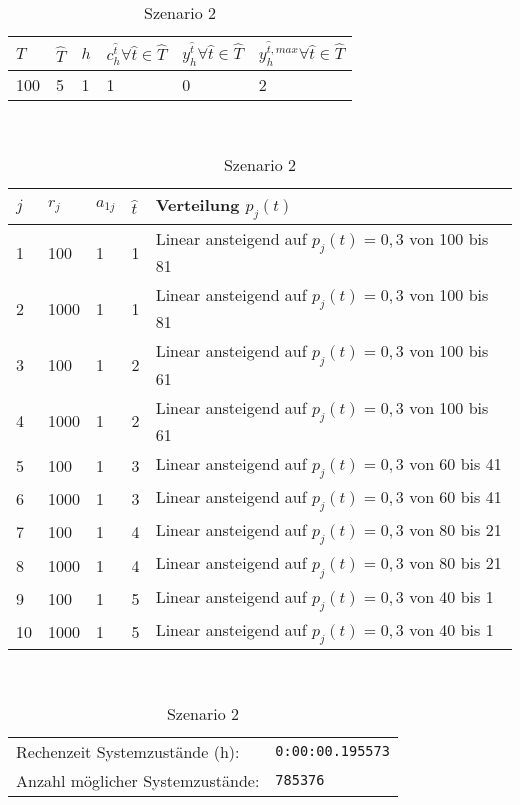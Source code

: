 \begin{table}[h!]
\renewcommand{\arraystretch}{1.5}
  \begin{center}
    \caption{Szenario 2}  \label{S2}
    \vspace*{3mm}
    \begin{tabular}{l l l l l l}   %
    $T$ & $\hat T$  & $h$ & $c_h^{\hat t}\forall \hat{t}\in{\hat T}$ & $y_h^{\hat t}\forall \hat{t}\in{\hat T}$  & $y_h^{{\hat t},max}\forall \hat{t}\in{\hat T}$  \\  \hline
100 & 5 & 1 & 1 & 0 & 2  \\ \hline
    \end{tabular} \\[3mm]
        \begin{tabular}{p{.5cm} p{.5cm} p{.5cm}  p{.5cm} p{9cm}}   %
    $j$ & $r_j$  & $a_{1j}$ & $\hat t$ & Verteilung $p_j(t)$ \\  \hline
1 & 100 & 1 & 1 & Linear ansteigend auf $p_j(t)=0,3$ von 100 bis 81   \\
2 & 1000 & 1 & 1 & Linear ansteigend auf $p_j(t)=0,3$ von 100 bis 81  \\
3 & 100 & 1 & 2 & Linear ansteigend auf $p_j(t)=0,3$ von 100 bis 61  \\
4 & 1000 & 1 & 2 & Linear ansteigend auf $p_j(t)=0,3$ von 100 bis 61  \\
5 & 100 & 1 & 3 & Linear ansteigend auf $p_j(t)=0,3$ von 60 bis 41 \\
6 & 1000 & 1 & 3 & Linear ansteigend auf $p_j(t)=0,3$ von 60 bis 41 \\
7 & 100 & 1 & 4 & Linear ansteigend auf $p_j(t)=0,3$ von 80 bis 21  \\
8 & 1000 & 1 & 4 & Linear ansteigend auf $p_j(t)=0,3$ von 80 bis 21  \\
9 & 100 & 1 & 5 & Linear ansteigend auf $p_j(t)=0,3$ von 40 bis 1  \\
10 & 1000 & 1 & 5 & Linear ansteigend auf $p_j(t)=0,3$ von 40 bis 1  \\ \hline
    \end{tabular} \\[3mm]
     \begin{tabular}{p{7cm}p{5cm}} \hline
     Rechenzeit Systemzustände (h): & \texttt{0:00:00.195573} \\
     Anzahl möglicher Systemzustände: & \texttt{785376} \\

\end{tabular}
\end{center}
\end{table}
